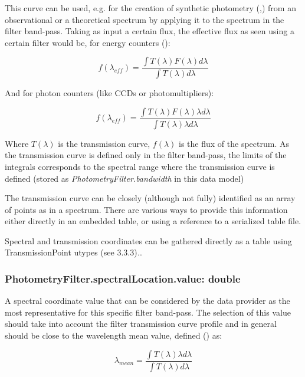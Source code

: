 \documentclass[11pt,a4paper]{ivoa}
\begin{document}

\par

This curve can be used, e.g. for the creation of synthetic photometry (\cite{1996BaltA...5..459S},\cite{2004A&A...422..205G}) from an observational or a theoretical spectrum by applying it to the spectrum in the filter band-pass. Taking as input a certain flux, the effective flux as seen using a certain filter would be, for energy counters (\cite{2007ASPC..364..227M}):
\par

\[
f(\lambda_{eff}) = \frac{\int T(\lambda)F(\lambda)d\lambda}{\int T(\lambda)d\lambda}
\]

And for photon counters (like CCDs or photomultipliers):
\par

\[
f(\lambda_{eff}) = \frac{\int T(\lambda)F(\lambda)\lambda d\lambda}{\int T(\lambda)\lambda d\lambda}
\]

Where $T(\lambda)$ is the transmission curve, $f(\lambda)$ is the flux of the spectrum. As the transmission curve is defined only in the filter band-pass, the limits of the integrals corresponds to the spectral range where the transmission curve is defined (stored as \textit{PhotometryFilter.bandwidth} in this data model) 
\par

The transmission curve can be closely (although not fully) identified as an array of points as in a spectrum. There are various ways to provide this information either directly in an embedded table, or using a reference to a serialized table file.
\par

Spectral and transmission coordinates can be gathered directly as a table using TransmissionPoint utypes (see 3.3.3)\textit{.}.
\par

\subsubsection{PhotometryFilter.spectralLocation.value: double}
A spectral coordinate value that can be considered by the data provider as the most representative for this specific filter band-pass. The selection of this value should take into account the filter transmission curve profile and in general should be close to the wavelength mean value, defined (\cite{1982AJ.....87..670O}) as: 
\par
\[
\lambda_{mean} = \frac{\int T(\lambda)\lambda d\lambda}{\int T(\lambda)d\lambda}
\]
\end{document}
